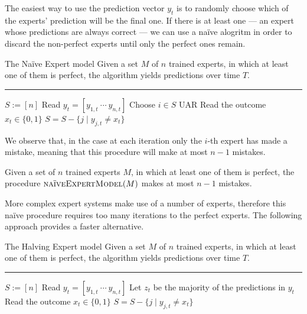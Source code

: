 \documentclass[a4paper, 12pt]{report}
\begin{document}
    The easiest way to use the prediction vector $y_t$ is to randomly choose which of the experts' prediction will be the final one. If there is at least one  --- an expert whose predictions are always correct --- we can use a naïve alogritm in order to discard the non-perfect experts until only the perfect ones remain.

    \begin{framedalgo}{The Naïve Expert model}
        Given a set $M$ of $n$ trained experts, in which at least one of them is perfect, the algorithm yields predictions over time $T$. \\
        \hrule

        \quad
        \begin{algorithmic}[1]
                \State $S := [n]$
                    \State Read $y_t = [y_{1, t} \ \cdots \ y_{n, t}]$
                    \State Choose $i \in S$ UAR
                    \State Read the outcome $x_t \in \{0, 1\}$
                        \State $S = S - \{j \mid y_{j, t} \neq x_t\}$
                    \EndIf
                \EndFor
            \EndFunction
        \end{algorithmic}
    \end{framedalgo}

    We observe that, in the  case at each iteration only the $i$-th expert has made a mistake, meaning that this procedure will make at most $n - 1$ mistakes.

    \begin{framedprop}{}
        Given a set of $n$ trained experts $M$, in which at least one of them is perfect, the procedure $\textsc{naïveExpertModel}(M)$ makes at most $n - 1$ mistakes.
    \end{framedprop}

    More complex expert systems make use of a  number of experts, therefore this naïve procedure requires too many iterations to  the perfect experts. The following approach provides a faster alternative.

    \begin{framedalgo}{The Halving Expert model}
        Given a set $M$ of $n$ trained experts, in which at least one of them is perfect, the algorithm yields predictions over time $T$. \\
        \hrule

        \quad
        \begin{algorithmic}[1]
                \State $S := [n]$
                    \State Read $y_t = [y_{1, t} \ \cdots \ y_{n, t}]$
                    \State Let $z_t$ be the majority of the predictions in $y_t$
                    \State Read the outcome $x_t \in \{0, 1\}$
                        \State $S = S - \{j \mid y_{j, t} \neq x_t\}$
                    \EndIf
                \EndFor
            \EndFunction
        \end{algorithmic}
    \end{framedalgo}
\end{document}
